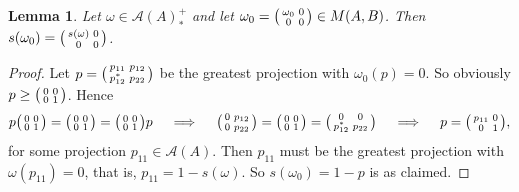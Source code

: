 \documentclass[a4paper,11pt]{article}
\theoremstyle{plain}
\newtheorem{lemma}[proposition]{Lemma}
\theoremstyle{remark}
\newcommand{\mc}[1]{\mathcal{#1}}
\newenvironment{smat}{\bigl(\begin{smallmatrix}}{\end{smallmatrix}\bigr)}
\begin{document}
\begin{lemma}\label{lem:support_corner_pos_func}
Let $\omega \in \mc A(A)_*^+$ and let $\omega_0 = \begin{smat} \omega_0 & 0 \\ 0 & 0 \end{smat} \in M(A,B)$.  Then $s(\omega_0) = \begin{smat} s(\omega) & 0 \\ 0 & 0 \end{smat}$.
\end{lemma}
\begin{proof}
Let $p = \begin{smat} p_{11} & p_{12} \\ p_{12}^* & p_{22} \end{smat}$ be the greatest projection with $\omega_0(p)=0$.  So obviously $p \geq \begin{smat} 0 & 0 \\ 0 & 1 \end{smat}$.  Hence
\[ p \begin{smat} 0 & 0 \\ 0 & 1 \end{smat} = \begin{smat} 0 & 0 \\ 0 & 1 \end{smat} = \begin{smat} 0 & 0 \\ 0 & 1 \end{smat} p
\quad\implies\quad
\begin{smat} 0 & p_{12} \\ 0 & p_{22} \end{smat} = \begin{smat} 0 & 0 \\ 0 & 1 \end{smat}
= \begin{smat} 0 & 0 \\ p_{12}^* & p_{22} \end{smat}
\quad\implies\quad
p = \begin{smat} p_{11} & 0 \\ 0 & 1 \end{smat}, \]
for some projection $p_{11} \in \mc A(A)$.  Then $p_{11}$ must be the greatest projection with $\omega(p_{11})=0$, that is, $p_{11} = 1-s(\omega)$.  So $s(\omega_0) = 1 - p$ is as claimed.
\end{proof}
\end{document}
